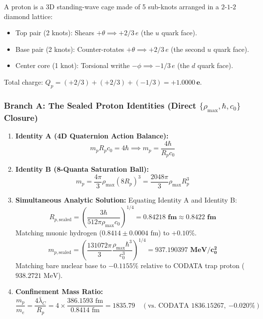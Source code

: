 \documentclass[11pt,a4paper]{article}
\begin{document}
A proton is a 3D standing-wave cage made of 5 sub-knots arranged in a $2\text{-}1\text{-}2$ diamond lattice:
\begin{itemize}
    \item Top pair (2 knots): Shears $+\theta \implies +2/3\,e$ (the $u$ quark face).
    \item Base pair (2 knots): Counter-rotates $+\theta \implies +2/3\,e$ (the second $u$ quark face).
    \item Center core (1 knot): Torsional writhe $-\phi \implies -1/3\,e$ (the $d$ quark face).
\end{itemize}
Total charge: $Q_p = (+2/3) + (+2/3) + (-1/3) = \mathbf{+1.0000\,e}$.

\subsubsection{Branch A: The Sealed Proton Identities (Direct $\{\rho_{\max}, \hbar, c_0\}$ Closure)}
\label{subsubsec:branch_a}

\begin{enumerate}
    \item \textbf{Identity A (4D Quaternion Action Balance):}
    \begin{equation}
    m_p R_p c_0 = 4\hbar \implies m_p = \frac{4\hbar}{R_p c_0}
    \end{equation}
    \item \textbf{Identity B (8-Quanta Saturation Ball):}
    \begin{equation}
    m_p = \frac{4\pi}{3}\rho_{\max} (8 R_p)^3 = \frac{2048\pi}{3}\rho_{\max} R_p^3
    \end{equation}
    \item \textbf{Simultaneous Analytic Solution:} Equating Identity A and Identity B:
    \begin{equation}
    \boxed{R_{p,\text{sealed}} = \left(\frac{3\hbar}{512\pi \rho_{\max} c_0}\right)^{1/4} = \mathbf{0.84218\text{ fm}} \approx \mathbf{0.8422\text{ fm}}}
    \end{equation}
    Matching muonic hydrogen ($0.8414 \pm 0.0004\text{ fm}$) to \textbf{$+0.10\%$}.
    \begin{equation}
    \boxed{m_{p,\text{sealed}} = \left(\frac{131072\pi}{3}\frac{\rho_{\max}\hbar^3}{c_0^3}\right)^{1/4} = \mathbf{937.190397\text{ MeV}/c_0^2}}
    \end{equation}
    Matching bare nuclear base to \textbf{$-0.1155\%$} relative to CODATA trap proton \allowbreak($938.2721\text{ MeV}$).
    \item \textbf{Confinement Mass Ratio:}
    \begin{equation}
    \frac{m_p}{m_e} = \frac{4\bar{\lambda}_C}{R_p} = 4 \times \frac{386.1593\text{ fm}}{0.8414\text{ fm}} = \mathbf{1835.79} \quad (\text{vs. CODATA } 1836.15267, \ \mathbf{-0.020\%})
    \end{equation}
\end{enumerate}
\end{document}
